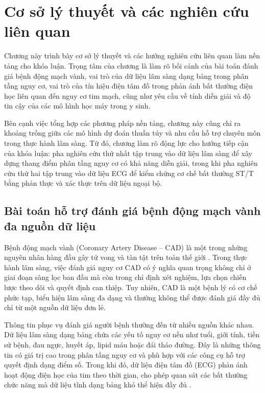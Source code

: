 \clearpage
{}

\setcounter{chapter}{0}
\chapter[{CƠ SỞ LÝ THUYẾT VÀ CÁC NGHIÊN CỨU LIÊN QUAN}]{Cơ sở lý thuyết và các nghiên cứu liên quan}

Chương này trình bày cơ sở lý thuyết và các hướng nghiên cứu liên quan làm nền tảng cho khóa luận. Trọng tâm của chương là làm rõ bối cảnh của bài toán đánh giá bệnh động mạch vành, vai trò của dữ liệu lâm sàng dạng bảng trong phân tầng nguy cơ, vai trò của tín hiệu điện tâm đồ trong phản ánh bất thường điện học liên quan đến nguy cơ tim mạch, cũng như yêu cầu về tính diễn giải và độ tin cậy của các mô hình học máy trong y sinh.

\blocksep

Bên cạnh việc tổng hợp các phương pháp nền tảng, chương này cũng chỉ ra khoảng trống giữa các mô hình dự đoán thuần túy và nhu cầu hỗ trợ chuyên môn trong thực hành lâm sàng. Từ đó, chương làm rõ động lực cho hướng tiếp cận của khóa luận: pha nghiên cứu thứ nhất tập trung vào dữ liệu lâm sàng để xây dựng thang điểm phân tầng nguy cơ có khả năng diễn giải, trong khi pha nghiên cứu thứ hai tập trung vào dữ liệu ECG để kiểm chứng cơ chế bất thường ST/T bằng phản thực và xác thực trên dữ liệu ngoại bộ.

\blocksep

\section{Bài toán hỗ trợ đánh giá bệnh động mạch vành đa nguồn dữ liệu}

\blocksep

Bệnh động mạch vành (Coronary Artery Disease -- CAD) là một trong những nguyên nhân hàng đầu gây tử vong và tàn tật trên toàn thế giới \cite{Libby2011}. Trong thực hành lâm sàng, việc đánh giá nguy cơ CAD có ý nghĩa quan trọng không chỉ ở giai đoạn sàng lọc ban đầu mà còn trong chỉ định xét nghiệm, lựa chọn chiến lược theo dõi và quyết định can thiệp. Tuy nhiên, CAD là một bệnh lý có cơ chế phức tạp, biểu hiện lâm sàng đa dạng và thường không thể được đánh giá đầy đủ chỉ từ một nguồn dữ liệu đơn lẻ.

\blocksep

Thông tin phục vụ đánh giá người bệnh thường đến từ nhiều nguồn khác nhau. Dữ liệu lâm sàng dạng bảng chứa các yếu tố nguy cơ nền như tuổi, giới tính, tiền sử bệnh, đau ngực, huyết áp, lipid máu hoặc đái tháo đường. Đây là những thông tin có giá trị cao trong phân tầng nguy cơ và phù hợp với các công cụ hỗ trợ quyết định dạng điểm số. Trong khi đó, dữ liệu điện tâm đồ (ECG) phản ánh hoạt động điện học của tim theo thời gian, cho phép quan sát các bất thường chức năng mà dữ liệu tĩnh dạng bảng khó thể hiện đầy đủ \cite{Clifford2006}.

